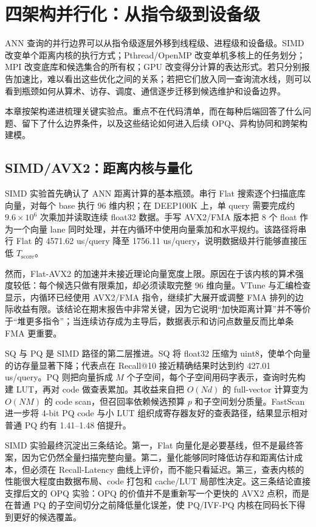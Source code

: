 \documentclass[a4paper,11pt,UTF8]{ctexart}
\begin{document}
\section{四架构并行化：从指令级到设备级}

ANN 查询的并行边界可以从指令级逐层外移到线程级、进程级和设备级。SIMD 改变单个距离内核的执行方式；Pthread/OpenMP 改变单机多核上的任务划分；MPI 改变底库和候选集合的所有权；GPU 改变得分计算的表达形式。若只分别报告加速比，难以看出这些优化之间的关系；若把它们放入同一查询流水线，则可以看到瓶颈如何从算术、访存、调度、通信逐步迁移到候选维护和设备边界。

本章按架构递进梳理关键实验点。重点不在代码清单，而在每种后端回答了什么问题、留下了什么边界条件，以及这些结论如何进入后续 OPQ、异构协同和跨架构建模。

\subsection{SIMD/AVX2：距离内核与量化}

SIMD 实验首先确认了 ANN 距离计算的基本瓶颈。串行 Flat 搜索逐个扫描底库向量，对每个 base 执行 96 维内积；在 DEEP100K 上，单 query 需要完成约 $9.6\times10^6$ 次乘加并读取连续 float32 数据。手写 AVX2/FMA 版本把 8 个 float 作为一个向量 lane 同时处理，并在内循环中使用向量乘加和水平规约。该路径将串行 Flat 的 4571.62 us/query 降至 1756.11 us/query，说明数据级并行能够直接压低 $T_{\mathrm{score}}$。

然而，Flat-AVX2 的加速并未接近理论向量宽度上限。原因在于该内核的算术强度较低：每个候选只做有限乘加，却必须读取完整 96 维向量。VTune 与汇编检查显示，内循环已经使用 AVX2/FMA 指令，继续扩大展开或调整 FMA 排列的边际收益有限。该结论在期末报告中非常关键，因为它说明“加快距离计算”并不等价于“堆更多指令”；当连续访存成为主导后，数据表示和访问点数量反而比单条 FMA 更重要。

SQ 与 PQ 是 SIMD 路径的第二层推进。SQ 将 float32 压缩为 uint8，使单个向量的访存量显著下降；代表点在 Recall@10 接近精确结果时达到约 427.01 us/query。PQ 则把向量拆成 $M$ 个子空间，每个子空间用码字表示，查询时先构建 LUT，再对 code 做查表累加。其收益来自把 $O(Nd)$ 的 full-vector 计算变为 $O(NM)$ 的 code scan，但召回率依赖候选预算 $p$ 和子空间划分质量。FastScan 进一步将 4-bit PQ code 与小 LUT 组织成寄存器友好的查表路径，结果显示相对普通 PQ 约有 1.41--1.48 倍提升。

SIMD 实验最终沉淀出三条结论。第一，Flat 向量化是必要基线，但不是最终答案，因为它仍然全量扫描完整向量。第二，量化能够同时降低访存和距离估计成本，但必须在 Recall-Latency 曲线上评价，而不能只看延迟。第三，查表内核的性能很大程度由数据布局、code 打包和 cache/LUT 局部性决定。这三条结论直接支撑后文的 OPQ 实验：OPQ 的价值并不是重新写一个更快的 AVX2 点积，而是在普通 PQ 的子空间切分之前降低量化误差，使 PQ/IVF-PQ 内核在同码长下得到更好的候选覆盖。
\end{document}
